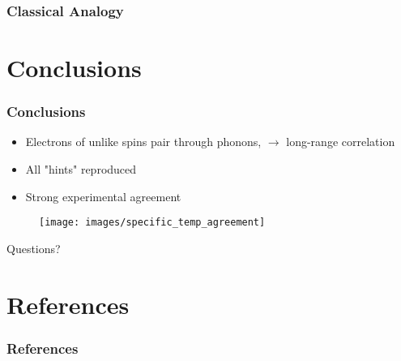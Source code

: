 \documentclass{beamer}
\begin{document}
		\begin{frame}
			\frametitle{Classical Analogy}
			\begin{figure}
				\centering
				\caption{\textcolor{gray}{\cite{bcs_anim}}}
			\end{figure}
		\end{frame}
		
		\section{Conclusions}
		\begin{frame}
			\frametitle{Conclusions}
			\begin{multicols}{2}
				\begin{itemize}
					\item Electrons of unlike spins pair through phonons, $ \rightarrow$ long-range correlation 
					\item All "hints" reproduced
					\item Strong experimental agreement 
				\end{itemize}
				\columnbreak
				\begin{figure}
					\centering
					\texttt{[image: images/specific\_temp\_agreement]}
					\label{fig:specifictempagreement}
				\end{figure}
			\end{multicols}
			
		\centering Questions?
		\end{frame}
	\backupbegin
	
	\appendix
	\section{References}
	\begin{frame}
		\frametitle{References} \tiny
		
		
	\end{frame}
\end{document}
